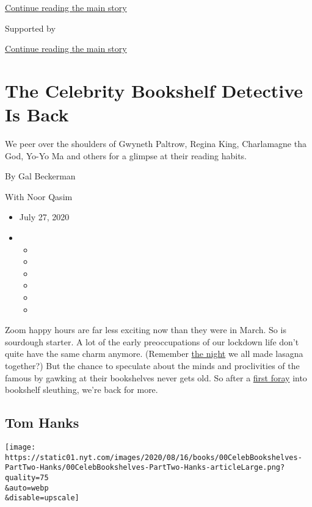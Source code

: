 \protect\hyperlink{after-top}{Continue reading the main story}

Supported by

\protect\hyperlink{after-sponsor}{Continue reading the main story}

\hypertarget{the-celebrity-bookshelf-detective-is-back}{%
\section{The Celebrity Bookshelf Detective Is
Back}\label{the-celebrity-bookshelf-detective-is-back}}

We peer over the shoulders of Gwyneth Paltrow, Regina King, Charlamagne
tha God, Yo-Yo Ma and others for a glimpse at their reading habits.

By Gal Beckerman

With Noor Qasim

\begin{itemize}
\item
  July 27, 2020
\item
  \begin{itemize}
  \item
  \item
  \item
  \item
  \item
  \item
  \end{itemize}
\end{itemize}

Zoom happy hours are far less exciting now than they were in March. So
is sourdough starter. A lot of the early preoccupations of our lockdown
life don't quite have the same charm anymore. (Remember
\href{https://www.nytimes.com/2020/04/27/dining/samin-nosrat-lasagna.html}{the
night} we all made lasagna together?) But the chance to speculate about
the minds and proclivities of the famous by gawking at their bookshelves
never gets old. So after a
\href{https://www.nytimes.com/2020/04/30/books/celebrity-bookshelves-tv-coronavirus.html}{first
foray} into bookshelf sleuthing, we're back for more.

\hypertarget{tom-hanks}{%
\subsection{Tom Hanks}\label{tom-hanks}}

\texttt{[image: https://static01.nyt.com/images/2020/08/16/books/00CelebBookshelves-PartTwo-Hanks/00CelebBookshelves-PartTwo-Hanks-articleLarge.png?quality=75\\\&auto=webp\\\&disable=upscale]}

